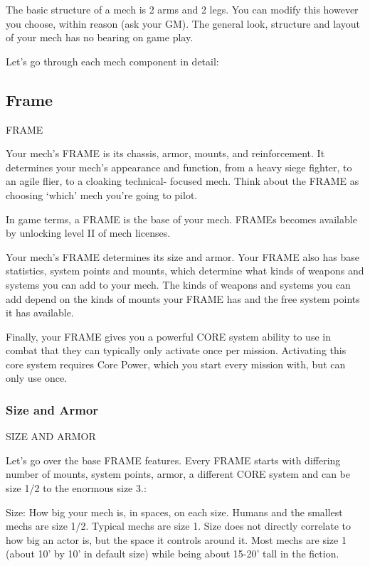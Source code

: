 The basic structure of a mech is 2 arms and 2 legs. You can modify this however you choose,
within reason (ask your GM). The general look, structure and layout of your mech has no
bearing on game play.


Let’s go through each mech component in detail:

\subsection{Frame}
                                                 FRAME

Your mech’s FRAME is its chassis, armor, mounts, and reinforcement. It determines your mech’s
appearance and function, from a heavy siege fighter, to an agile flier, to a cloaking technical-
focused mech. Think about the FRAME as choosing ‘which’ mech you’re going to pilot.


In game terms, a FRAME is the base of your mech. FRAMEs becomes available by unlocking
level II of mech licenses.


Your mech’s FRAME determines its size and armor. Your FRAME also has base statistics,
system points and mounts, which determine what kinds of weapons and systems you can add
to your mech. The kinds of weapons and systems you can add depend on the kinds of mounts
your FRAME has and the free system points it has available.


Finally, your FRAME gives you a powerful CORE system ability to use in combat that they can
typically only activate once per mission. Activating this core system requires Core Power, which
you start every mission with, but can only use once.

\subsubsection{Size and Armor}
                                        SIZE AND ARMOR

Let’s go over the base FRAME features. Every FRAME starts with differing number of mounts,
system points, armor, a different CORE system and can be size 1/2 to the enormous size 3.:


Size: How big your mech is, in spaces, on each size. Humans and the smallest mechs are size
1/2. Typical mechs are size 1. Size does not directly correlate to how big an actor is, but the
space it controls around it. Most mechs are size 1 (about 10’ by 10’ in default size) while being
about 15-20’ tall in the fiction.

